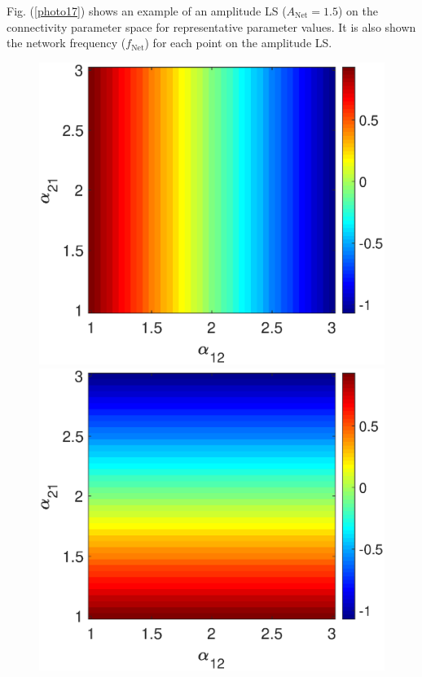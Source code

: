 Fig. (\ref{photo17}) shows an example of an amplitude LS ($A_{\text{Net}}=1.5$) on the connectivity parameter space for representative parameter values. It is also shown the network frequency ($f_{\text{Net}}$) for each point on the amplitude LS.

  \begin{figure}[h]
        \begin{minipage}{0.32\linewidth}
            \begin{center}
                \includegraphics[width=1\linewidth]{Images/photo17_1.eps}
            \end{center}
        \end{minipage} 
        \begin{minipage}{0.32\linewidth}
            \begin{center}
                \includegraphics[width=1\linewidth]{Images/photo17_2.eps}

\end{center}
\end{minipage}
\end{figure}
